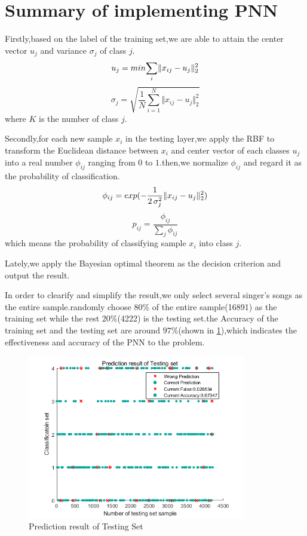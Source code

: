 \section{Summary of implementing PNN}
Firstly,based on the label of the training set,we are able to attain the center vector $u_j$ and variance $\sigma_j$ of class $j$.
\begin{equation}
    u_j=min{\sum_i}\Vert x_{ij}-u_j\Vert_2^2\\
\end{equation}
\begin{equation}
    \sigma_j=\sqrt{\frac{1}{N}\sum_{i=1}^{N}\Vert x_{ij}-u_j\Vert_2^2}
\end{equation}
where $K$ is the number of class $j$.
\par
Secondly,for each new sample $x_i$ in the testing layer,we apply the RBF to transform the Euclidean distance between $x_i$ and center vector of each classes $u_j$ into a real number $\phi_{ij}$ ranging from $0$ to $1$.then,we normalize $\phi_{ij}$ and regard it as the probability of classification.
\begin{equation}
    \phi_{ij}=\\exp{(-\frac{1}{2\,\sigma_j^2} \Vert {x}_{ij}-{u}_{j}\Vert_2^2})
\end{equation}
\begin{equation}
    p_{ij}=\frac{\phi_{ij}}{\sum_{j}\phi_{ij}}
\end{equation}
which means the probability of classifying sample $x_i$ into class $j$.
\par
Lately,we apply the Bayesian optimal theorem as the decision criterion and output the result.
\par
In order to clearify and simplify the result,we only select several singer's songs as the entire sample.randomly choose $80\%$ of the entire sample(16891) as the training set while the rest $20\%$(4222) is the testing set.the Accuracy of the training set and the testing set are around $97\%$(shown in \ref{fig:estimationresult}),which indicates the effectiveness and accuracy of the PNN to the problem.
\begin{figure}[b]
    \centering
    \includegraphics[width=0.85\textwidth]{figures/zxt/estimationresult.png}
    \caption{Prediction result of Testing Set}
    \label{fig:estimationresult}
\end{figure}